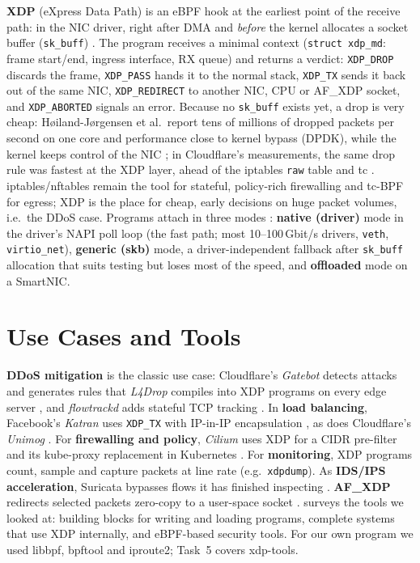 \textbf{XDP} (eXpress Data Path) is an eBPF hook at the earliest point of the receive path: in the NIC driver, right after DMA and \emph{before} the kernel allocates a socket buffer (\texttt{sk\_buff}) \autocite{hoiland2018xdp,ebpfdocs_xdp}. The program receives a minimal context (\texttt{struct xdp\_md}: frame start/end, ingress interface, RX queue) and returns a verdict: \texttt{XDP\_DROP} discards the frame, \texttt{XDP\_PASS} hands it to the normal stack, \texttt{XDP\_TX} sends it back out of the same NIC, \texttt{XDP\_REDIRECT} to another NIC, CPU or AF\_XDP socket, and \texttt{XDP\_ABORTED} signals an error. Because no \texttt{sk\_buff} exists yet, a drop is very cheap: Høiland-Jørgensen et al.\ report tens of millions of dropped packets per second on one core and performance close to kernel bypass (DPDK), while the kernel keeps control of the NIC \autocite{hoiland2018xdp}; in Cloudflare's measurements, the same drop rule was fastest at the XDP layer, ahead of the iptables \texttt{raw} table and tc \autocite{cf_drop10m}. iptables/nftables remain the tool for stateful, policy-rich firewalling and tc-BPF for egress; XDP is the place for cheap, early decisions on huge packet volumes, i.e.\ the DDoS case. Programs attach in three modes \autocite{ebpfdocs_xdp,cilium_bpfref}: \textbf{native (driver)} mode in the driver's NAPI poll loop (the fast path; most 10--100\,Gbit/s drivers, \texttt{veth}, \texttt{virtio\_net}), \textbf{generic (skb)} mode, a driver-independent fallback after \texttt{sk\_buff} allocation that suits testing but loses most of the speed, and \textbf{offloaded} mode on a SmartNIC.

\section{Use Cases and Tools}\label{sec:t4-usecases}\label{sec:t4-tools}
\textbf{DDoS mitigation} is the classic use case: Cloudflare's \emph{Gatebot} detects attacks and generates rules that \emph{L4Drop} compiles into XDP programs on every edge server \autocite{cf_gatebot,cf_l4drop}, and \emph{flowtrackd} adds stateful TCP tracking \autocite{cf_flowtrackd}. In \textbf{load balancing}, Facebook's \emph{Katran} uses \texttt{XDP\_TX} with IP-in-IP encapsulation \autocite{meta_katran,katran_github}, as does Cloudflare's \emph{Unimog} \autocite{cf_unimog}. For \textbf{firewalling and policy}, \emph{Cilium} uses XDP for a CIDR pre-filter and its kube-proxy replacement in Kubernetes \autocite{cilium_kpr,cilium_bpfref}. For \textbf{monitoring}, XDP programs count, sample and capture packets at line rate (e.g.\ \texttt{xdpdump}). As \textbf{IDS/IPS acceleration}, Suricata bypasses flows it has finished inspecting \autocite{suricata_ebpf}. \textbf{AF\_XDP} redirects selected packets zero-copy to a user-space socket \autocite{kdoc_afxdp}.  surveys the tools we looked at: building blocks for writing and loading programs, complete systems that use XDP internally, and eBPF-based security tools. For our own program we used libbpf, bpftool and iproute2; Task~5 covers xdp-tools.

